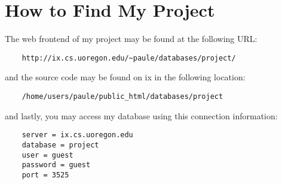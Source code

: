 \section{How to Find My Project}
The web frontend of my project may be found at the following URL:
\begin{verbatim}
    http://ix.cs.uoregon.edu/~paule/databases/project/
\end{verbatim}
and the source code may be found on ix in the following location:
\begin{verbatim}
    /home/users/paule/public_html/databases/project
\end{verbatim}
and lastly, you may access my database using this connection information:
\begin{verbatim}
    server = ix.cs.uoregon.edu
    database = project
    user = guest
    password = guest
    port = 3525
\end{verbatim}
